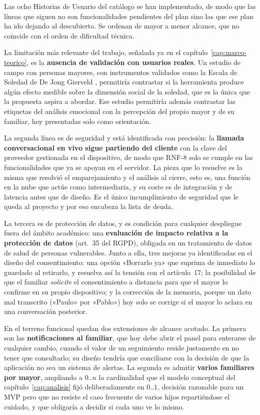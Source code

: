 Las ocho Historias de Usuario del catálogo se han implementado, de modo que las líneas que siguen no son
funcionalidades pendientes del plan sino las que ese plan ha ido dejando al descubierto. Se ordenan de mayor
a menor alcance, que no coincide con el orden de dificultad técnica.

La limitación más relevante del trabajo, señalada ya en el capítulo~\ref{cap:marco-teorico}, es la
\textbf{ausencia de validación con usuarios reales}. Un estudio de campo con personas mayores, con
instrumentos validados como la Escala de Soledad de De Jong Gierveld \citep{DeJongGierveld2010}, permitiría
contrastar si la herramienta produce algún efecto medible sobre la dimensión social de la soledad, que es la
única que la propuesta aspira a abordar. Ese estudio permitiría además contrastar las etiquetas del análisis
emocional con la percepción del propio mayor y de su familiar, hoy presentadas solo como orientación.

La segunda línea es de seguridad y está identificada con precisión: la \textbf{llamada conversacional en
vivo sigue partiendo del cliente} con la clave del proveedor gestionada en el dispositivo, de modo que RNF-8
solo se cumple en las funcionalidades que ya se apoyan en el servidor. La pieza que lo resuelve es la misma
que resolvió el emparejamiento y el análisis al cierre, esto es, una función en la nube que actúe como
intermediaria, y su coste es de integración y de latencia antes que de diseño. Es el único incumplimiento de
seguridad que le queda al proyecto y por eso encabeza la lista de deuda.

La tercera es de protección de datos, y es condición para cualquier despliegue fuera del ámbito académico:
una \textbf{evaluación de impacto relativa a la protección de datos} (art.~35 del RGPD), obligada en un
tratamiento de datos de salud de personas vulnerables. Junto a ella, tres mejoras ya identificadas en el
diseño del consentimiento: una opción «Borrarlo ya» que suprima de inmediato lo guardado al retirarlo, y
resuelva así la tensión con el artículo~17; la posibilidad de que el familiar \emph{solicite} el
consentimiento a distancia para que el mayor lo confirme en su propio dispositivo; y la corrección de la
memoria, porque un dato mal transcrito («Paulo» por «Pablo») hoy solo se corrige si el mayor lo aclara en
una conversación posterior.

En el terreno funcional quedan dos extensiones de alcance acotado. La primera son las
\textbf{notificaciones al familiar}, que hoy debe abrir el panel para enterarse de cualquier cambio, cuando
el valor de un seguimiento reside justamente en no tener que consultarlo; su diseño tendría que conciliarse
con la decisión de que la aplicación no sea un sistema de alertas. La segunda es admitir \textbf{varios
familiares por mayor}, ampliando a $0..n$ la cardinalidad que el modelo conceptual del
capítulo~\ref{cap:analisis} fijó deliberadamente en $0..1$, decisión razonable para un MVP pero que no resiste
el caso frecuente de varios hijos repartiéndose el cuidado, y que obligaría a decidir si cada uno ve lo mismo.

